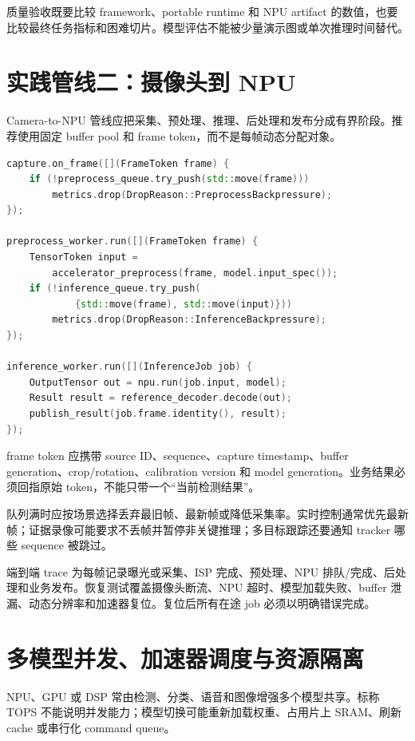 质量验收既要比较 framework、portable runtime 和 NPU artifact 的数值，也要比较最终任务指标和困难切片。模型评估不能被少量演示图或单次推理时间替代。

\section{实践管线二：摄像头到 NPU}

Camera-to-NPU 管线应把采集、预处理、推理、后处理和发布分成有界阶段。推荐使用固定 buffer pool 和 frame token，而不是每帧动态分配对象。

\noindent\begin{minipage}{\textwidth}
\begin{lstlisting}[language=C++,caption={端侧视觉管线的有界调度（伪代码）}]
capture.on_frame([](FrameToken frame) {
    if (!preprocess_queue.try_push(std::move(frame)))
        metrics.drop(DropReason::PreprocessBackpressure);
});

preprocess_worker.run([](FrameToken frame) {
    TensorToken input =
        accelerator_preprocess(frame, model.input_spec());
    if (!inference_queue.try_push(
            {std::move(frame), std::move(input)}))
        metrics.drop(DropReason::InferenceBackpressure);
});

inference_worker.run([](InferenceJob job) {
    OutputTensor out = npu.run(job.input, model);
    Result result = reference_decoder.decode(out);
    publish_result(job.frame.identity(), result);
});
\end{lstlisting}
\end{minipage}

frame token 应携带 source ID、sequence、capture timestamp、buffer generation、crop/rotation、calibration version 和 model generation。业务结果必须回指原始 token，不能只带一个“当前检测结果”。

队列满时应按场景选择丢弃最旧帧、最新帧或降低采集率。实时控制通常优先最新帧；证据录像可能要求不丢帧并暂停非关键推理；多目标跟踪还要通知 tracker 哪些 sequence 被跳过。

端到端 trace 为每帧记录曝光或采集、ISP 完成、预处理、NPU 排队/完成、后处理和业务发布。恢复测试覆盖摄像头断流、NPU 超时、模型加载失败、buffer 泄漏、动态分辨率和加速器复位。复位后所有在途 job 必须以明确错误完成。

\section{多模型并发、加速器调度与资源隔离}

NPU、GPU 或 DSP 常由检测、分类、语音和图像增强多个模型共享。标称 TOPS 不能说明并发能力；模型切换可能重新加载权重、占用片上 SRAM、刷新 cache 或串行化 command queue。

